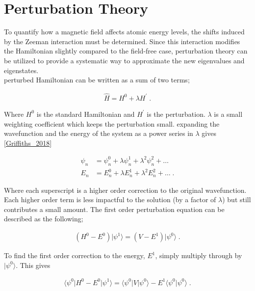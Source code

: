             

    \section{Perturbation Theory} \label{sec:Perturbation_Theory}
        To quantify how a magnetic field affects atomic energy levels, the shifts induced by the Zeeman interaction must be determined. Since this interaction modifies the Hamiltonian slightly compared to the field-free case, perturbation theory can be utilized to provide a systematic way to approximate the new eigenvalues and eigenstates.\\

        \noindent perturbed Hamiltonian can be written as a sum of two terms;

        \begin{align}
            \hat{H} = H^0 + \lambda H^\prime\;.
        \end{align}

        \noindent Where $H^0$ is the standard Hamiltonian and $H^\prime$ is the perturbation. $\lambda$ is a small weighting coefficient which keeps the perturbation small. expanding the wavefunction and the energy of the system as a power series in $\lambda$ gives \ref{Griffiths_2018}

        \begin{align}
            \psi_n &= \psi_n^0 + \lambda \psi_n^1 + \lambda^2 \psi_n^2 + \dots\\
            E_n &= E_n^0 + \lambda E_n^1 + \lambda^2 E_n^2 + \dots\;.
        \end{align}

        \noindent Where each superscript is a higher order correction to the original wavefunction. Each higher order term is less impactful to the solution (by a factor of $\lambda$) but still contributes a small amount. The first order perturbation equation can be described as the following;

        \begin{align}
            \left( H^0 - E^0 \right) \vert \psi^1 \rangle = \left(V - E^1 \right) \vert \psi^0 \rangle\;.
        \end{align}

        \noindent To find the first order correction to the energy, $E^1$, simply multiply through by $\vert \psi^0 \rangle$. This gives

        \begin{align}
            \langle \psi^0 \vert H^0 - E^0 \vert \psi^1 \rangle = \langle \psi^0 \vert V \vert \psi^0 \rangle -E^1 \langle \psi^0  \vert \psi^0 \rangle\;.
        \end{align}

